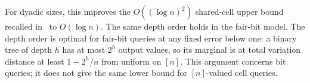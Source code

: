 For dyadic sizes, this improves the $O((\log n)^2)$ shared-cell
upper bound recalled in~\cite[Section~1]{AlekseevEtAl2025} to
$O(\log n)$. The same depth order holds in the fair-bit model.
The depth order is optimal for fair-bit queries at any fixed error
below one: a binary tree of depth $h$ has at most $2^h$ output values,
so its marginal is at total variation distance at least $1-2^h/n$
from uniform on $[n]$. This argument concerns bit queries; it does
not give the same lower bound for $[n]$-valued cell queries.
